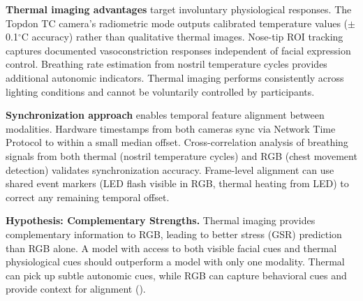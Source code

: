 \textbf{Thermal imaging advantages} target involuntary physiological responses. The Topdon TC camera's radiometric mode outputs calibrated temperature values ($\pm$0.1$^\circ$C accuracy) rather than qualitative thermal images. Nose-tip ROI tracking captures documented vasoconstriction responses independent of facial expression control. Breathing rate estimation from nostril temperature cycles provides additional autonomic indicators. Thermal imaging performs consistently across lighting conditions and cannot be voluntarily controlled by participants.

\textbf{Synchronization approach} enables temporal feature alignment between modalities. Hardware timestamps from both cameras sync via Network Time Protocol to within a small median offset. Cross-correlation analysis of breathing signals from both thermal (nostril temperature cycles) and RGB (chest movement detection) validates synchronization accuracy. Frame-level alignment can use shared event markers (LED flash visible in RGB, thermal heating from LED) to correct any remaining temporal offset.

\textbf{Hypothesis: Complementary Strengths.} Thermal imaging provides complementary information to RGB, leading to better stress (GSR) prediction than RGB alone. A model with access to both visible facial cues and thermal physiological cues should outperform a model with only one modality. Thermal can pick up subtle autonomic cues, while RGB can capture behavioral cues and provide context for alignment (\citep{ref5}).

